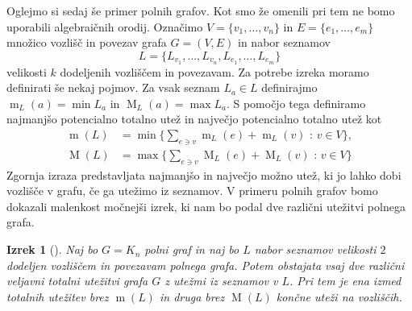 \documentclass[12pt,a4paper,twoside]{article}
\theoremstyle{definition} %
\theoremstyle{plain} %
\newtheorem{izrek}[definicija]{Izrek}
\numberwithin{equation}{section}  %
\DeclareMathOperator{\m}{m}
\DeclareMathOperator{\M}{M}
\begin{document}
Oglejmo si sedaj še primer polnih grafov. Kot smo že omenili pri tem ne bomo uporabili algebraičnih orodij. Označimo $V = \{v_1, \ldots, v_n\}$ in $E = \{e_1, \ldots, e_m\}$ množico vozlišč in povezav grafa $G=(V,E)$ in nabor seznamov
 $$L = \{L_{v_1}, \ldots, L_{v_n}, L_{e_1}, \ldots, L_{e_m}\}$$ velikosti $k$ dodeljenih vozliščem in povezavam. Za potrebe izreka moramo definirati še nekaj pojmov. Za vsak seznam $L_a \in L$ definirajmo $\m_L(a) = \min L_a$ in $\M_L(a) = \max L_a$. S pomočjo tega definiramo najmanjšo potencialno totalno utež in največjo potencialno totalno utež kot
\begin{equation*}
\begin{split}
\m(L) &= \min \Big \{ \sum_{e \ni v} \m_L(e) + \m_L(v) \text{ : } v \in V\Big \}, \\
\M(L) &= \max \Big\{ \sum_{e \ni v} \M_L(e) + \M_L(v) \text{ : } v \in V\Big \} 
\end{split}
\end{equation*}
Zgornja izraza predstavljata najmanjšo in največjo možno utež, ki jo lahko dobi vozlišče v grafu, če ga utežimo iz seznamov. V primeru polnih grafov bomo dokazali malenkost  močnejši izrek, ki nam bo podal dve različni utežitvi polnega grafa.
\begin{izrek}[\citet{algebraic}]
\label{list_t_complete}
Naj bo $G = K_n$ polni graf in naj bo $L$ nabor seznamov velikosti $2$ dodeljen vozliščem in povezavam polnega grafa. Potem obstajata vsaj dve različni veljavni totalni utežitvi grafa $G$ z utežmi iz seznamov v $L$. Pri tem je ena izmed totalnih utežitev brez $\m(L)$ in druga brez $\M(L)$ končne uteži na vozliščih.
\end{izrek}
\end{document}
